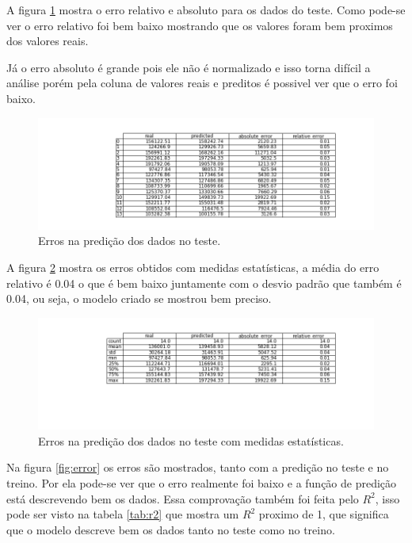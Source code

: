 \documentclass[11pt]{article}
\begin{document}
A figura \ref{fig:abs_rel_error} mostra o erro relativo e absoluto para os dados do teste. Como pode-se ver o erro relativo foi bem baixo mostrando que os valores foram bem proximos dos valores reais.

Já o erro absoluto é grande pois ele não é normalizado e isso torna difícil a análise porém pela coluna de valores reais e preditos é possivel ver que o erro foi baixo.

\begin{figure}[htbp]
\centering
\includegraphics[width=.9\linewidth]{./abs_rel_error.png}
\caption{\label{fig:abs_rel_error}
Erros na predição dos dados no teste.}
\end{figure}

A figura \ref{fig:abs_rel_error_des} mostra os erros obtidos com medidas estatísticas, a média do erro relativo é 0.04 o que é bem baixo juntamente com o desvio padrão que também é 0.04, ou seja, o modelo criado se mostrou bem preciso.

\begin{figure}[htbp]
\centering
\includegraphics[width=.9\linewidth]{./abs_rel_error_des.png}
\caption{\label{fig:abs_rel_error_des}
Erros na predição dos dados no teste com medidas estatísticas.}
\end{figure}


Na figura \ref{fig:error} os erros são mostrados, tanto com a predição no teste e no treino. Por ela pode-se ver que o erro realmente foi baixo e a função de predição está descrevendo bem os dados.
Essa comprovação também foi feita pelo \(R^2\), isso pode ser visto na tabela \ref{tab:r2} que mostra um \(R^2\) proximo de 1, que significa que o modelo descreve bem os dados tanto no teste como no treino.
\end{document}
